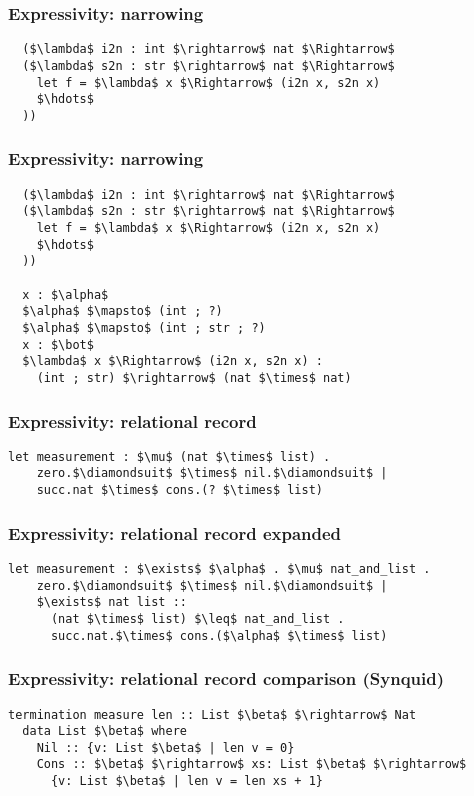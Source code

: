 \documentclass{beamer}
\begin{document}
\begin{frame}[fragile]
  \frametitle{Expressivity: narrowing}

  \begin{lstlisting}
  ($\lambda$ i2n : int $\rightarrow$ nat $\Rightarrow$ 
  ($\lambda$ s2n : str $\rightarrow$ nat $\Rightarrow$ 
    let f = $\lambda$ x $\Rightarrow$ (i2n x, s2n x)
    $\hdots$
  ))
  \end{lstlisting}
\end{frame}

\begin{frame}[fragile]
  \frametitle{Expressivity: narrowing}

  \begin{lstlisting}
  ($\lambda$ i2n : int $\rightarrow$ nat $\Rightarrow$ 
  ($\lambda$ s2n : str $\rightarrow$ nat $\Rightarrow$ 
    let f = $\lambda$ x $\Rightarrow$ (i2n x, s2n x)
    $\hdots$
  ))
  
  x : $\alpha$
  $\alpha$ $\mapsto$ (int ; ?)
  $\alpha$ $\mapsto$ (int ; str ; ?)
  x : $\bot$
  $\lambda$ x $\Rightarrow$ (i2n x, s2n x) : 
    (int ; str) $\rightarrow$ (nat $\times$ nat) 
  \end{lstlisting}
\end{frame}

\begin{frame}[fragile]
  \frametitle{Expressivity: relational record}

  \begin{lstlisting}[]
  let measurement : $\mu$ (nat $\times$ list) .
    zero.$\diamondsuit$ $\times$ nil.$\diamondsuit$ | 
    succ.nat $\times$ cons.(? $\times$ list)
  \end{lstlisting} 

\end{frame}

\begin{frame}[fragile]
  \frametitle{Expressivity: relational record expanded}

  \begin{lstlisting}[]
  let measurement : $\exists$ $\alpha$ . $\mu$ nat_and_list .
    zero.$\diamondsuit$ $\times$ nil.$\diamondsuit$ | 
    $\exists$ nat list :: 
      (nat $\times$ list) $\leq$ nat_and_list . 
      succ.nat.$\times$ cons.($\alpha$ $\times$ list)
  \end{lstlisting}

\end{frame}

\begin{frame}[fragile]
  \frametitle{Expressivity: relational record comparison (Synquid)}

  \begin{lstlisting}[keywords={termination, measure, data, where}]
  termination measure len :: List $\beta$ $\rightarrow$ Nat 
  data List $\beta$ where
    Nil :: {v: List $\beta$ | len v = 0}
    Cons :: $\beta$ $\rightarrow$ xs: List $\beta$ $\rightarrow$ 
      {v: List $\beta$ | len v = len xs + 1}

  \end{lstlisting}
\end{frame}
\end{document}
